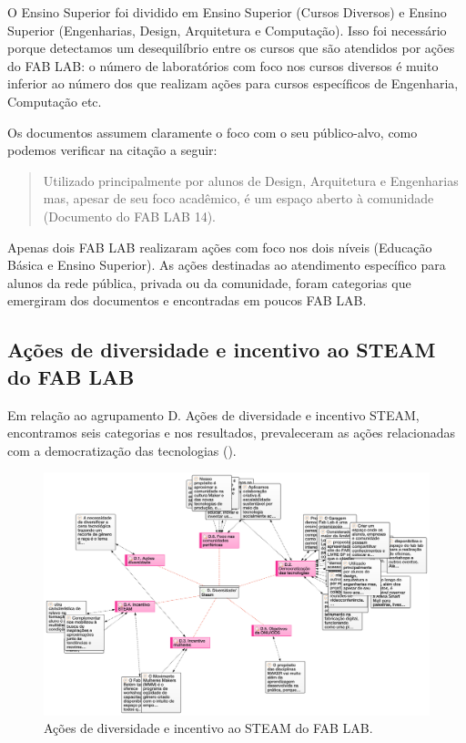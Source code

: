 \documentclass[portuguese]{textolivre}
\begin{document}
O Ensino Superior foi dividido em Ensino Superior (Cursos Diversos) e Ensino Superior (Engenharias, Design, Arquitetura e Computação). Isso foi necessário porque detectamos um desequilíbrio entre os cursos que são atendidos por ações do FAB LAB: o número de laboratórios com foco nos cursos diversos é muito inferior ao número dos que realizam ações para cursos específicos de Engenharia, Computação etc.

Os documentos assumem claramente o foco com o seu público-alvo, como podemos verificar na citação a seguir:

\begin{quote}
    Utilizado principalmente por alunos de Design, Arquitetura e Engenharias mas, apesar de seu foco acadêmico, é um espaço aberto à comunidade (Documento do FAB LAB 14).
\end{quote}

Apenas dois FAB LAB realizaram ações com foco nos dois níveis (Educação Básica e Ensino Superior). As ações destinadas ao atendimento específico para alunos da rede pública, privada ou da comunidade, foram categorias que emergiram dos documentos e encontradas em poucos FAB LAB.

\subsection{Ações de diversidade e incentivo ao STEAM do FAB LAB}\label{sec-organizacao-latex}
Em relação ao agrupamento D. Ações de diversidade e incentivo STEAM, encontramos seis categorias e nos resultados, prevaleceram as ações relacionadas com a democratização das tecnologias ().

\begin{figure}
\centering
\begin{minipage}{\textwidth}
\includegraphics[width=\linewidth]{Fig6.png}
\caption{Ações de diversidade e incentivo ao STEAM do FAB LAB.}
\label{fig6}
\end{minipage}
\end{figure}
\end{document}
